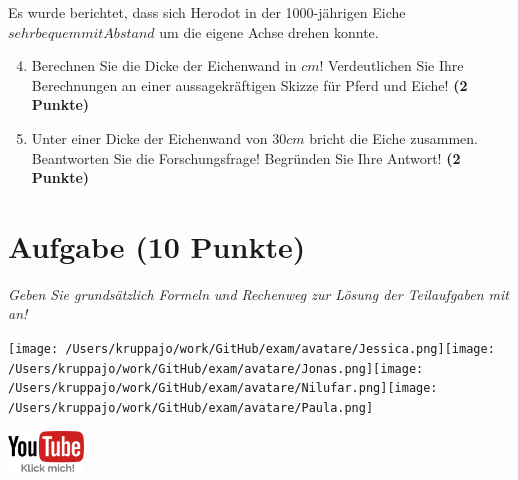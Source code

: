 \documentclass[a4paper, 9pt]{scrartcl}\usepackage[]{graphicx}\usepackage[]{xcolor}
\begin{document}
Es wurde berichtet, dass sich Herodot in der 1000-jährigen Eiche $sehr bequem mit Abstand$ um die eigene Achse drehen konnte.

\begin{enumerate}
  \setcounter{enumi}{3}
\item Berechnen Sie die Dicke der Eichenwand in $cm$! Verdeutlichen Sie Ihre Berechnungen an einer aussagekräftigen Skizze für Pferd und Eiche! \textbf{(2 Punkte)} 
\item Unter einer Dicke der Eichenwand von $30cm$ bricht die Eiche zusammen. Beantworten Sie die Forschungsfrage! Begründen Sie Ihre Antwort! \textbf{(2 Punkte)} 
\end{enumerate}
 
\clearpage

\section{Aufgabe \hfill (10 Punkte)}

\textit{Geben Sie grundsätzlich Formeln und Rechenweg zur Lösung der Teilaufgaben mit an!} \\[1Ex]
 

 
\ifcollection
\begin{flushright}
\tiny\vspace{-3Ex}
\textbf{\examinhaltstart}
\exammodulemathstat
\vspace{-4Ex}
\end{flushright}
\begin{minipage}[t]{0.5\textwidth}
\texttt{[image: /Users/kruppajo/work/GitHub/exam/avatare/Jessica.png]}\hspace{-4mm}\texttt{[image: /Users/kruppajo/work/GitHub/exam/avatare/Jonas.png]}\hspace{-4mm}\texttt{[image: /Users/kruppajo/work/GitHub/exam/avatare/Nilufar.png]}\hspace{-4mm}\texttt{[image: /Users/kruppajo/work/GitHub/exam/avatare/Paula.png]}
\end{minipage}
\begin{minipage}[t]{0.5\textwidth}
\hfill
\href{https://youtu.be/57B-yYoFSk0}{\includegraphics[width = 2cm]{img/youtube}}
\end{minipage}
\fi
\end{document}
